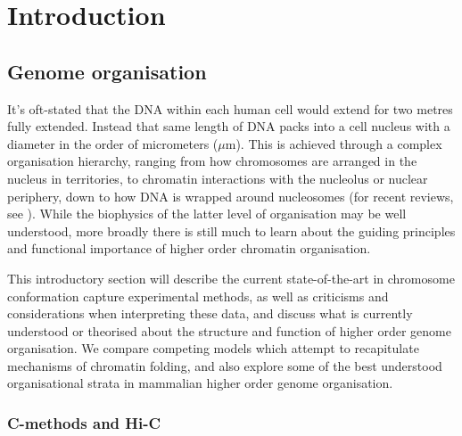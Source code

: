 \documentclass[a4paper,11pt,oneside]{book}
\begin{document}

\chapter{Introduction}
\section{Genome organisation}\label{intro:genomeorg}
%
It's oft-stated that the DNA within each human cell would extend for two metres fully extended. Instead that same length of DNA packs into a cell nucleus with a diameter in the order of micrometers ($\mu$m). This is achieved through a complex organisation hierarchy, ranging from how chromosomes are arranged in the nucleus in territories, to chromatin interactions with the nucleolus or nuclear periphery, down to how DNA is wrapped around nucleosomes (for recent reviews, see ). While the biophysics of the latter level of organisation may be well understood, more broadly there is still much to learn about the guiding principles and functional importance of higher order chromatin organisation.

This introductory section will describe the current state-of-the-art in chromosome conformation capture experimental methods, as well as criticisms and considerations when interpreting these data, and discuss what is currently understood or theorised about the structure and function of higher order genome organisation. We compare competing models which attempt to recapitulate mechanisms of chromatin folding, and also explore some of the best understood organisational strata in mammalian higher order genome organisation.

%

\subsection{C-methods and Hi-C}
\end{document}
